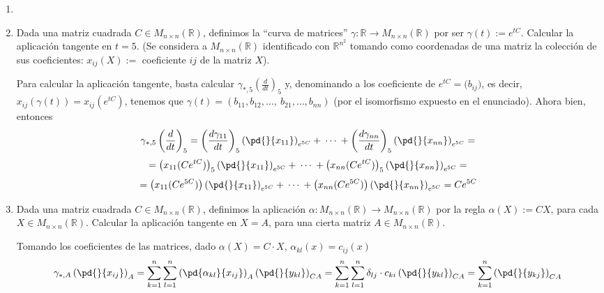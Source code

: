 \begin{enumerate}
    \item 
    \item Dada una matriz cuadrada $C \in M_{n\times n}(\mathbb R)$, definimos la ``curva de matrices'' $\gamma : \mathbb R \longrightarrow M_{n\times n}(\mathbb R)$  por ser $\gamma(t) := e^{tC}$. Calcular la aplicación tangente en $t = 5$. (Se considera a $M_{n\times n}(\mathbb R)$ identificado con $\mathbb R^{n^2}$ tomando como coordenadas de una matriz la colección de sus coeficientes: $x_{ij} (X) :=$ coeficiente $ij$ de la matriz $X$).
    \begin{sol}
        Para calcular la aplicación tangente, basta calcular $\gamma_{*,5}\left( \frac{d}{dt}\right)_5$ y, denominando a los coeficiente de $e^{tC}=\big(b_{ij}\big)$, es decir, $x_{ij}(\gamma(t))=x_{ij}(e^{tC})$, tenemos que $\gamma(t)=(b_{11}, b_{12}, \ldots, \: b_{21}, \ldots, b_{nn})$ (por el isomorfismo expuesto en el enunciado). Ahora bien, entonces
        $$\gamma_{*,5}\left( \frac{d}{dt}\right)_5=\left( \dfrac{d\gamma_{11}}{dt}\right)_5 \left(\pd{}{x_{11}} \right)_{e^{5C}} + \: \cdots \: + \left( \dfrac{d \gamma_{nn}}{dt}\right)_5 \left(\pd{}{x_{nn}} \right)_{e^{5C}}=$$
        $$=\left( x_{11}(C e^{tC})\right)_5 \left(\pd{}{x_{11}} \right)_{e^{5C}} + \: \cdots \: + \left(  x_{nn}(C e^{tC})\right)_5 \left(\pd{}{x_{nn}} \right)_{e^{5C}}=$$
        $$=\left( x_{11}(C e^{5C})\right) \left(\pd{}{x_{11}} \right)_{e^{5C}} + \: \cdots \: + \left(  x_{nn}(C e^{5C})\right) \left(\pd{}{x_{nn}} \right)_{e^{5C}}=C e^{5C}$$
        
    \end{sol}
    \item  Dada una matriz cuadrada $C \in M_{n\times n}(\mathbb R)$, definimos la aplicación $\alpha: M_{n\times n}(\mathbb R) \longrightarrow M_{n\times n}(\mathbb R)$ por la regla $\alpha(X) := CX$, para cada $X \in M_{n\times n}(\mathbb R)$. Calcular la aplicación tangente en $X = A$, para una cierta matriz $A \in M_{n\times n}(\mathbb R)$.  
    \begin{sol} Tomando los coeficientes de las matrices, dado $\alpha(X)=C \cdot X$, $\alpha_{kl}(x)= c_{ij}(x) $
        $$\gamma_{*,A} \left( \pd{}{x_{ij}} \right)_A=\sum_{k=1}^n\sum_{l=1}^n  \left( \pd{\alpha_{kl}}{x_{ij}} \right)_A  \left( \pd{}{y_{kl}} \right)_{CA}=\sum_{k=1}^n\sum_{l=1}^n \delta_{lj} \cdot c_{ki}  \left( \pd{}{y_{kl}} \right)_{CA}=\sum_{k=1}^n  \left( \pd{}{y_{kj}} \right)_{CA}$$
    \end{sol}
\end{enumerate}
